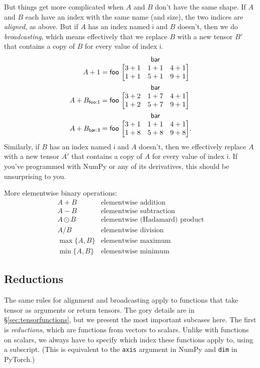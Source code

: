 \documentclass{article}
\makeatletter
\newcommand{\name}[1]{\mathsf{#1}}
\newcommand{\namedmatrix}[3]{%
\ifx #1\end\end \else #1\ \fi
\begin{array}[b]{@{}c@{}} \smash{#2} \\ \begin{bmatrix} #3 \end{bmatrix} \end{array}
}
\makeatother
\begin{document}
But things get more complicated when $A$ and $B$ don't have the same shape. If $A$ and $B$ each have an index with the same name (and size), the two indices are \emph{aligned}, as above. But if $A$ has an index named $\name{i}$ and $B$ doesn't, then we do \emph{broadcasting}, which means effectively that we replace $B$ with a new tensor $B'$ that contains a copy of $B$ for every value of index $\name{i}$.
\begin{align*}
A + 1 &= \namedmatrix{\name{foo}}{\name{bar}}{
  3+1 & 1+1 & 4+1 \\
  1+1 & 5+1 & 9+1
} \\
A + B_{\name{foo:1}} &= \namedmatrix{\name{foo}}{\name{bar}}{
  3+2 & 1+7 & 4+1 \\
  1+2 & 5+7 & 9+1
} \\
A + B_{\name{bar:3}} &= \namedmatrix{\name{foo}}{\name{bar}}{
  3+1 & 1+1 & 4+1 \\
  1+8 & 5+8 & 9+8
}.
\end{align*}
Similarly, if $B$ has an index named $\name{i}$ and $A$ doesn't, then we effectively replace $A$ with a new tensor $A'$ that contains a copy of $A$ for every value of index $\name{i}$. If you've programmed with NumPy or any of its derivatives, this should be unsurprising to you.

More elementwise binary operations:
\[\begin{array}{cl}
A+B & \text{elementwise addition} \\
A-B & \text{elementwise subtraction} \\
A\odot B & \text{elementwise (Hadamard) product} \\
A / B & \text{elementwise division} \\
\max \{A, B\} & \text{elementwise maximum} \\
\min \{A, B\} & \text{elementwise minimum}
\end{array}\]

\subsection{Reductions}
\label{sec:reductions}

The same rules for alignment and broadcasting apply to functions that take tensor as arguments or return tensors. The gory details are in \S\ref{sec:tensorfunctions}, but we present the most important subcases here. The first is \emph{reductions}, which are functions from vectors to scalars. Unlike with functions on scalars, we always have to specify which index these functions apply to, using a subscript. (This is equivalent to the \verb|axis| argument in NumPy and \verb|dim| in PyTorch.)
\end{document}
